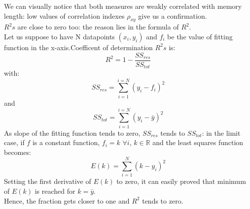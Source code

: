 We can visually notice that both measures are weakly correlated with memory length: low values of correlation indexes $\rho_{xy}$ give us a confirmation.\\
$R^2s$ are close to zero too: the reason lies in the  formula of $R^2$.\\
Let us suppose to have N datapoints $(x_i,y_i)$ and $f_i$ be the value of fitting function in the x-axis.Coefficent of determination $R^2s$ is:
$$
R^{2}= 1-{\frac {SS_{ res}}  {SS_{ tot}}}
$$
with:
$$
SS_{ res}=\sum_{i=1}^{i=N}{(y_i - f_i)^2}
$$
and
$$
SS_{ tot}=\sum_{i=1}^{i=N}{(y_i - \bar{y})^2}
$$
As slope of the fitting function tends to zero, $SS_{res}$ tends to $SS_{tot}$: in the
limit case, if $f$ is a constant function, $f_i=k$ $\forall  i$,  $k \in  \mathbb{R}$ and the least squares function becomes:
$$
E(k)= \sum_{i=1}^{N}{(k-y_i)^2} 
$$
Setting the first derivative of $E(k)$ to zero, it can easily proved that minimum of $E(k)$ is reached for $k=\bar{y}$.\\
Hence, the fraction gets closer to one and $R^2$ tends to zero.
